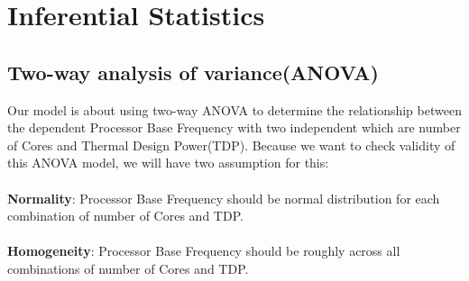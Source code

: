 \section{Inferential Statistics}
\subsection{Two-way analysis of variance(ANOVA)}
Our model is about using two-way ANOVA to determine the relationship between the dependent Processor Base Frequency with two independent which are number of Cores and Thermal Design Power(TDP). Because we want to check validity of this ANOVA model, we will have two assumption for this:\\
\\
\textbf{Normality}: Processor Base Frequency should be normal distribution for each combination of number of Cores and TDP.\\
\\
\textbf{Homogeneity}: Processor Base Frequency should be roughly across all combinations of number of Cores and TDP.
